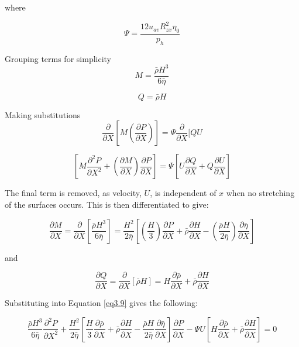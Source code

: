 where

\begin{equation}\label{eq3.5}
	\Psi=\frac{12 u_{a v} R_{z x}^{2} \eta_{0}}{p_{h}}
\end{equation}

Grouping terms for simplicity
\begin{equation}\label{eq3.6}
	M=\frac{\bar{\rho} H^{3}}{6 \bar{\eta}}
\end{equation}

\begin{equation}\label{eq3.7}
	Q=\bar{\rho} H
\end{equation}

Making substitutions
\begin{equation}\label{eq3.8}
	\frac{\partial}{\partial X}\left[M\left(\frac{\partial P}{\partial X}\right)\right]=\Psi \frac{\partial}{\partial X}[Q U
\end{equation}

\begin{equation}\label{eq3.9}
	\left[M \frac{\partial^{2} P}{\partial X^{2}}+\left(\frac{\partial M}{\partial X}\right) \frac{\partial P}{\partial X}\right]=\Psi\left[U \frac{\partial Q}{\partial X}+Q \frac{\partial U}{\partial X}\right]
\end{equation}

The final term is removed, as velocity, $U$, is independent of $x$ when no stretching of the surfaces occurs. This is then differentiated to give:

\begin{equation}\label{eq3.10}
	\frac{\partial M}{\partial X}=\frac{\partial}{\partial X}\left[\frac{\bar{\rho} H^{3}}{6 \bar{\eta}}\right]=\frac{H^{2}}{2 \bar{\eta}}\left[\left(\frac{H}{3}\right) \frac{\partial P}{\partial X}+\bar{\rho} \frac{\partial H}{\partial X}-\left(\frac{\bar{\rho} H}{2 \bar{\eta}}\right) \frac{\partial \bar{\eta}}{\partial X}\right]
\end{equation}

and

\begin{equation}\label{eq3.11}
	\frac{\partial Q}{\partial X}=\frac{\partial}{\partial X}[\bar{\rho} H]=H \frac{\partial \bar{\rho}}{\partial X}+\bar{\rho} \frac{\partial H}{\partial X}
\end{equation}

Substituting into Equation \ref{eq3.9} gives the following:

\begin{equation}\label{eq1.12}
	\frac{\bar{\rho} H^{3}}{6 \bar{\eta}} \frac{\partial^{2} P}{\partial X^{2}}+\frac{H^{2}}{2 \bar{\eta}}\left[\frac{H}{3} \frac{\partial \bar{\rho}}{\partial X}+\bar{\rho} \frac{\partial H}{\partial X}-\frac{\bar{\rho} H}{2 \bar{\eta}} \frac{\partial \bar{\eta}}{\partial X}\right] \frac{\partial P}{\partial X}-\Psi U\left[H \frac{\partial \bar{\rho}}{\partial X}+\bar{\rho} \frac{\partial H}{\partial X}\right]=0
\end{equation}

